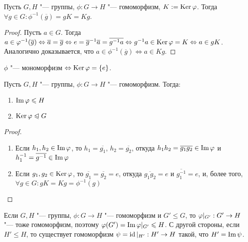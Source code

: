 \begin{proposition}
	Пусть $G, H$ "--- группы, $\phi: G \to H$ "--- гомоморфизм, $K := \operatorname{Ker}\varphi$. Тогда $\forall g \in G: \phi^{-1}(\overline{g}) = gK = Kg$.
\end{proposition}

\begin{proof}
	Пусть $a \in G$. Тогда $a \in \phi^{-1}(\overline{g}) \Leftrightarrow \overline{a} = \overline{g} \Leftrightarrow e \hm= \overline{g}^{-1}\overline{a} = \overline{g^{-1}a} \Leftrightarrow g^{-1}a \hm\in \ke\phi = K \Leftrightarrow a \in gK$. Аналогично доказывается, что $a \in \phi^{-1}(\overline{g}) \Leftrightarrow a \in Kg$.
\end{proof}

\begin{corollary}
	$\phi$ "--- мономорфизм $\Leftrightarrow \operatorname{Ker}\varphi = \{e\}$.
\end{corollary}

\begin{proposition}
	Пусть $G, H$ "--- группы, $\phi: G \to H$ "--- гомоморфизм. Тогда:
	\begin{enumerate}
		\item $\operatorname{Im}\varphi \leqslant H$
		\item $\operatorname{Ker}\varphi \trianglelefteqslant G$
	\end{enumerate}
\end{proposition}

\begin{proof}~
	\begin{enumerate}
		\item Если $h_1, h_2 \in \operatorname{Im}\varphi$, то $h_1 = \overline{g_1}$, $h_2 = \overline{g_2}$, откуда $h_1h_2 = \overline{g_1g_2} \hm\in \im\phi$ и $h_1^{-1} = \overline{g^{-1}} \in \operatorname{Im}\varphi$
		\item Если $g_1, g_2 \in \operatorname{Ker}\varphi$, то $\overline{g_1} = \overline{g_2} = e$, откуда $\overline{g_1g_2} = e$ и $\overline{g_1^{-1}} = e$, и, более того, $\forall g \in G: gK = Kg = \phi^{-1}(g)$
	\end{enumerate}
\end{proof}

\begin{note}
	Если $G, H$ "--- группы, $\phi: G \to H$ "--- гомоморфизм и $G' \le G$, то $\phi|_{G'}: G' \hm\to H$ "--- тоже гомоморфизм, поэтому $\phi(G') \hm= \im\phi|_{G'} \le H$. С другой стороны, если $H' \le H$, то существует гомоморфизм $\psi = \operatorname{id}|_{H'}: H' \to H$ такой, что $H' = \operatorname{Im}\psi$.
\end{note}

